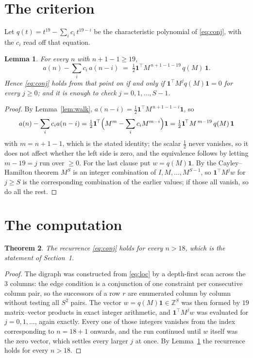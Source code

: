 \documentclass[11pt,a4paper]{article}
\theoremstyle{plain}
\newtheorem{theorem}{Theorem}
\newtheorem{lemma}[theorem]{Lemma}
\theoremstyle{definition}
\begin{document}
\section{The criterion}

Let $q(t)=t^{19}-\sum_i c_i\,t^{19-i}$ be the characteristic polynomial of
\eqref{eq:conj}, with the $c_i$ read off that equation.

\begin{lemma}\label{lem:crit}
For every $n$ with $n+1-1\ge19$,
\[
a(n)-\sum_i c_i\,a(n-i)\;=\;\tfrac1{2}\mathbf{1}^{\!\top}M^{\,n+1-1-19}\,q(M)\,\mathbf{1} .
\]
Hence \eqref{eq:conj} holds from that point on if and only if
$\mathbf{1}^{\!\top}M^{j}q(M)\mathbf{1}=0$ for every $j\ge0$; and it is enough to check
$j=0,1,\dots,S-1$.
\end{lemma}

\begin{proof}
By Lemma~\ref{lem:walk}, $a(n-i)=\tfrac1{2}\mathbf{1}^{\!\top}M^{\,n+1-1-i}\mathbf{1}$, so
\[
a(n)-\sum_i c_i a(n-i)
=\tfrac1{2}\mathbf{1}^{\!\top}\Bigl(M^{m}-\sum_i c_i M^{m-i}\Bigr)\mathbf{1}
=\tfrac1{2}\mathbf{1}^{\!\top}M^{\,m-19}\,q(M)\,\mathbf{1}
\]
with $m=n+1-1$, which is the stated identity; the scalar $\tfrac1{2}$ never vanishes, so it does not affect whether the left side is zero, and the equivalence follows by letting
$m-19=j$ run over $\ge0$. For the last clause put $w=q(M)\mathbf{1}$. By the
Cayley--Hamilton theorem $M^{S}$ is an integer combination of $I,M,\dots,M^{S-1}$, so
$\mathbf{1}^{\!\top}M^{j}w$ for $j\ge S$ is the corresponding combination of the earlier
values; if those all vanish, so do all the rest.
\end{proof}

\section{The computation}

\begin{theorem}
The recurrence \eqref{eq:conj} holds for every $n>18$, which is the statement of
Section~1.
\end{theorem}

\begin{proof}
The digraph was constructed from \eqref{eq:loc} by a depth-first scan across the $3$
columns: the edge condition is a conjunction of one constraint per consecutive column
pair, so the successors of a row $r$ are enumerated column by column without testing all
$S^2$ pairs. The vector $w=q(M)\mathbf{1}\in\mathbb{Z}^{S}$ was then formed by $19$
matrix--vector products in exact integer arithmetic, and $\mathbf{1}^{\!\top}M^{j}w$ was
evaluated for $j=0,1,\dots$, again exactly. Every one of those integers vanishes from the
index corresponding to $n=18+1$ onwards, and the run continued until $w$ itself was the
zero vector, which settles every larger $j$ at once. By Lemma~\ref{lem:crit} the recurrence
holds for every $n>18$.
\end{proof}
\end{document}
